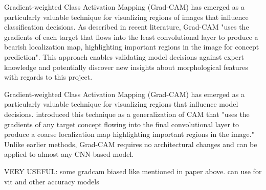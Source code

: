 \documentclass[a4paper,12pt]{report}
\begin{document}
Gradient-weighted Class Activation Mapping (Grad-CAM) has emerged as a particularly valuable technique for visualizing regions of images that influence classification decisions. As described in recent literature, Grad-CAM "uses the gradients of each target that flows into the least convolutional layer to produce a bearish localization map, highlighting important regions in the image for concept prediction"\citep{Hasibuan2023Large}. This approach enables validating model decisions against expert knowledge and potentially discover new insights about morphological features with regards to this project.



Gradient-weighted Class Activation Mapping (Grad-CAM) has emerged as a particularly valuable technique for visualizing regions that influence model decisions. \citep{Selvaraju_2019} introduced this technique as a generalization of CAM that "uses the gradients of any target concept flowing into the final convolutional layer to produce a coarse localization map highlighting important regions in the image." Unlike earlier methods, Grad-CAM requires no architectural changes and can be applied to almost any CNN-based model.

VERY USEFUL: some gradcam biased like mentioned in paper above. can use for vit and other accuracy models
\end{document}
